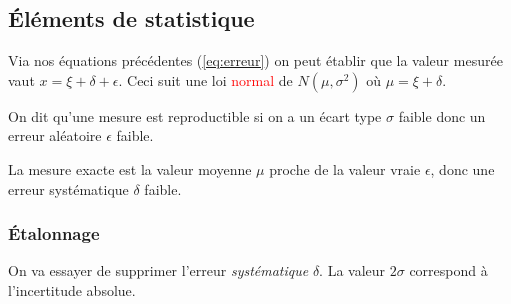 \documentclass{report}
\begin{document}
\subsection{Éléments de statistique}
Via nos équations précédentes (\ref{eq:erreur}) on peut établir que la valeur mesurée vaut $x = \xi + \delta + \epsilon$. Ceci suit une loi \textcolor{red}{normal} de $N(\mu , \sigma^2)$ où $\mu = \xi + \delta $.\par 
On dit qu'une mesure est reproductible si on a un écart type $\sigma$ faible donc un erreur aléatoire $\epsilon $ faible.\par 
La mesure exacte est la valeur moyenne $\mu$ proche de la valeur vraie $\epsilon$, donc une erreur systématique $\delta$ faible.

\subsubsection{Étalonnage}
On va essayer de supprimer l'erreur \textit{systématique} $\delta$. La valeur $2 \sigma$ correspond à l'incertitude absolue.
\end{document}

